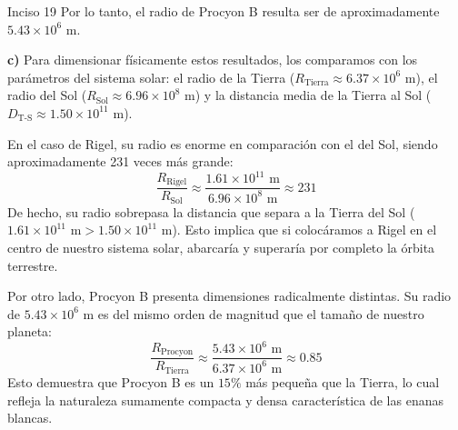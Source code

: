 \documentclass[11pt,letterpaper]{article}
\begin{document}
\begin{inciso}{Inciso 19}
\noindent Por lo tanto, el radio de Procyon B resulta ser de aproximadamente $5.43 \times 10^6\text{ m}$.

\vspace{0.8em}
\noindent \textbf{c)} Para dimensionar físicamente estos resultados, los comparamos con los parámetros del sistema solar: el radio de la Tierra ($R_{\text{Tierra}} \approx 6.37 \times 10^6\text{ m}$), el radio del Sol ($R_{\text{Sol}} \approx 6.96 \times 10^8\text{ m}$) y la distancia media de la Tierra al Sol ($D_{\text{T-S}} \approx 1.50 \times 10^{11}\text{ m}$).

\noindent En el caso de Rigel, su radio es enorme en comparación con el del Sol, siendo aproximadamente 231 veces más grande:
\begin{equation*}
    \frac{R_{\text{Rigel}}}{R_{\text{Sol}}} \approx \frac{1.61 \times 10^{11}\text{ m}}{6.96 \times 10^8\text{ m}} \approx 231
\end{equation*}
De hecho, su radio sobrepasa la distancia que separa a la Tierra del Sol ($1.61 \times 10^{11}\text{ m} > 1.50 \times 10^{11}\text{ m}$). Esto implica que si colocáramos a Rigel en el centro de nuestro sistema solar, abarcaría y superaría por completo la órbita terrestre.

\noindent Por otro lado, Procyon B presenta dimensiones radicalmente distintas. Su radio de $5.43 \times 10^6\text{ m}$ es del mismo orden de magnitud que el tamaño de nuestro planeta:
\begin{equation*}
    \frac{R_{\text{Procyon}}}{R_{\text{Tierra}}} \approx \frac{5.43 \times 10^6\text{ m}}{6.37 \times 10^6\text{ m}} \approx 0.85
\end{equation*}
Esto demuestra que Procyon B es un $15\% $ más pequeña que la Tierra, lo cual refleja la naturaleza sumamente compacta y densa característica de las enanas blancas.
\end{inciso}
\end{document}
